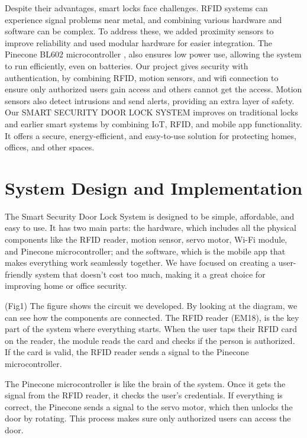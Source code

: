 \documentclass[USenglish,oneside,twocolumn]{article}
\begin{document}
Despite their advantages, smart locks face challenges. RFID systems can experience signal problems near metal, and combining various hardware and software can be complex. To address these, we added proximity sensors to improve reliability and used modular hardware for easier integration. The Pinecone BL602 microcontroller \cite{PINE64}, also ensures low power use, allowing the system to run efficiently, even on batteries. Our project gives security with authentication, by combining RFID, motion sensors, and wifi connection to ensure only authorized users gain access and others cannot get the access. Motion sensors also detect intrusions and send alerts, providing an extra layer of safety. Our SMART SECURITY DOOR LOCK SYSTEM improves on traditional locks and earlier smart systems by combining IoT, RFID, and mobile app functionality. It offers a secure, energy-efficient, and easy-to-use solution for protecting homes, offices, and other spaces.

    

\section{System Design and Implementation}
\label{sec:System Design and Implementation}
The Smart Security Door Lock System is designed to be simple, affordable, and easy to use. It has two main parts: the hardware, which includes all the physical components like the RFID reader, motion sensor, servo motor, Wi-Fi module, and Pinecone microcontroller; and the software, which is the mobile app that makes everything work seamlessly together. We have focused on creating a user-friendly system that doesn’t cost too much, making it a great choice for improving home or office security.

(Fig1) The figure shows the circuit we developed. By looking at the diagram, we can see how the components are connected. The RFID reader (EM18)\cite{RFIDReaderEM18}, is the key part of the system where everything starts. When the user taps their RFID card on the reader, the module reads the card and checks if the person is authorized. If the card is valid, the RFID reader sends a signal to the Pinecone microcontroller.

The Pinecone microcontroller is like the brain of the system. Once it gets the signal from the RFID reader, it checks the user’s credentials. If everything is correct, the Pinecone sends a signal to the servo motor, which then unlocks the door by rotating. This process makes sure only authorized users can access the door.
\end{document}
